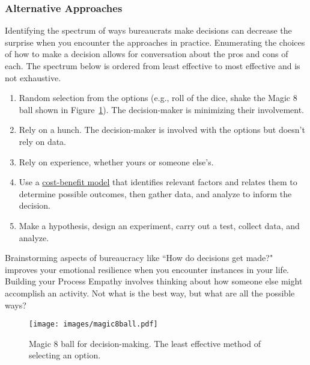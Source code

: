 \subsubsection*{Alternative Approaches}
Identifying the spectrum of ways bureaucrats make decisions can decrease the surprise when you encounter the approaches in practice. 
Enumerating the choices of how to make a decision allows for conversation about the pros and cons of each. The spectrum below is ordered from least effective to most effective and is not exhaustive.
\begin{enumerate}
    \item Random selection from the options (e.g., roll of the dice, shake the Magic 8 ball shown in Figure~\ref{fig:magic8ball}). The decision-maker is minimizing their involvement. 
    \item Rely on a hunch. The decision-maker is involved with the options but doesn't rely on data. 
    \item Rely on experience, whether yours or someone else's.
    \item Use a \href{https://en.wikipedia.org/wiki/Cost\%E2\%80\%93benefit_analysis}{cost-benefit model} that identifies relevant factors and relates them to determine possible outcomes, 
    \iftoggle{WPinmargin}{\marginpar{$>$Wikipedia: cost-benefit analysis}}{} then gather data, and analyze to inform the decision.
    \item Make a hypothesis, design an experiment, carry out a test, collect data, and analyze.
\end{enumerate}

Brainstorming aspects of bureaucracy like ``How do decisions get made?" improves your emotional resilience when you encounter instances in your life. Building your Process Empathy involves thinking about how someone else might accomplish an activity. Not what is the best way, but what are all the possible ways? %

\begin{figure}
    \centering
    \texttt{[image: images/magic8ball.pdf]}
    \caption{Magic 8 ball for decision-making. The least effective method of selecting an option.}
    \label{fig:magic8ball}
\end{figure}

